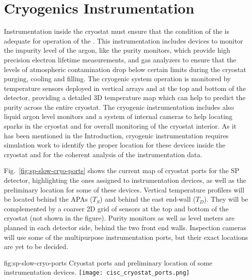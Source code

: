\section{Cryogenics Instrumentation}
\label{sec:fdsp-cryo-instr} %
\label{sec:fddp-cryo-instr} %
\label{sec:fdgen-cryo-instr} %

Instrumentation inside the cryostat must ensure that the condition of the  is adequate for operation of the .
This instrumentation includes devices to monitor the impurity level of the argon, like the purity monitors, which provide high precision electron lifetime measurements,
and gas analyzers to ensure that the levels of atmospheric contamination drop below certain limits during the cryostat purging, cooling and filling.
The cryogenic system operation is monitored by temperature sensors deployed in vertical arrays and at the top and bottom of the detector, providing a 
detailed 3D temperature map which can help to predict the  purity across the entire cryostat. The cryogenic instrumentation includes also liquid argon level monitors and
a system of internal cameras to help locating sparks in the cryostat and for overall monitoring of the cryostat interior. 
As it has been mentioned in the Introduction, cryogenic instrumentation requires simulation work to identify the proper location for these devices inside the cryostat and
for the coherent analysis of the instrumentation data. 

Fig.~\ref{fig:sp-slow-cryo-ports} shows the current map of cryostat ports for the SP detector, highlighting the ones assigned to instrumentation devices,
as well as the preliminary location for some of these devices. Vertical temperature profilers will be located behind the APAs ($T_S$) and behind the east end-wall ($T_D$).
They will be complemented by a coarser 2D grid of sensors at the top and bottom of the cryostat (not shown in the figure). Purity monitors as well as level meters are planned
in each detector side, behind the two front end walls. Inspection cameras will use some of the multipurpose instrumentation ports, but their exact locations are yet to be decided. 

\begin{dunefigure}{fig:sp-slow-cryo-ports}
{Cryostat ports and preliminary location of some instrumentation devices. }
\texttt{[image: cisc\_cryostat\_ports.png]}
\end{dunefigure}




